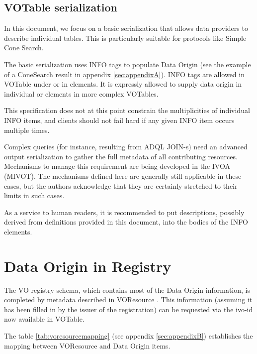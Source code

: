\documentclass[11pt,a4paper]{ivoa}
\begin{document}
\subsection{VOTable serialization}

In this document, we focus on a basic serialization that allows data
providers to describe individual tables.
This is particularly suitable for protocols like Simple Cone Search.

The basic serialization uses INFO tags to populate Data Origin (see the example of a ConeSearch result in appendix  \ref{sec:appendixA}).
INFO tags are allowed in VOTable under  or in  elements.
It is expressly allowed to supply data origin in individual
 or  elements in more complex VOTables.

This specification does not at this point constrain the multiplicities of individual INFO items, and clients should not fail hard if any given INFO item occurs multiple times.

Complex queries (for instance, resulting from ADQL JOIN-s) need an advanced output serialization to gather the full metadata of all contributing resources.
Mechanisms to manage this requirement are being developed in the IVOA
(MIVOT).
The mechanisms defined here are generally still applicable in these
cases, but the authors acknowledge that they are certainly stretched to
their limits in such cases.

As a service to human readers, it is recommended to put descriptions, possibly derived from definitions provided in this document, into the bodies of the INFO elements.


\section{Data Origin in Registry}
The VO registry schema, which contains most of the Data Origin information, is completed by metadata described in VOResource \citep{2018ivoa.spec.0625P}.
This information (assuming it has been filled in by the issuer of the registration) can be requested via the ivo-id now available in VOTable.

The table \ref{tab:voresourcemapping} (see appendix \ref{sec:appendixB}) establishes the mapping between VOResource and Data Origin items.
\end{document}
